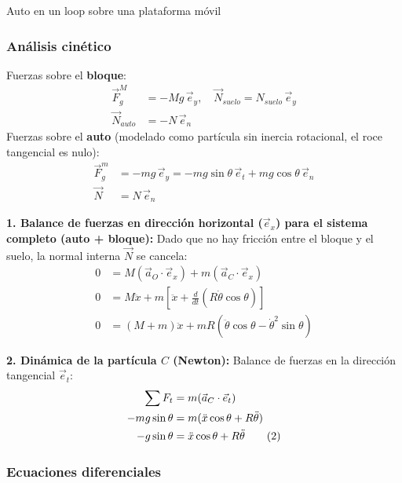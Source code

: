\begin{solucion}{Auto en un loop sobre una plataforma móvil}
\subsubsection*{Análisis cinético}

Fuerzas sobre el \textbf{bloque}:
\begin{align*}
\vec{F}_g^M &= -Mg\,\vec{e}_y, \quad \vec{N}_{suelo} = N_{suelo}\,\vec{e}_y \\
\vec{N}_{auto} &= -N\,\vec{e}_n
\end{align*}
Fuerzas sobre el \textbf{auto} (modelado como partícula sin inercia rotacional, el roce tangencial es nulo):
\begin{align*}
\vec{F}_g^m &= -mg\,\vec{e}_y = -mg\sin\theta\,\vec{e}_t + mg\cos\theta\,\vec{e}_n \\
\vec{N} &= N\,\vec{e}_n
\end{align*}

\textbf{1. Balance de fuerzas en dirección horizontal ($\vec{e}_x$) para el sistema completo (auto + bloque):}
Dado que no hay fricción entre el bloque y el suelo, la normal interna $\vec{N}$ se cancela:
\begin{align}
0 &= M(\vec{a}_O \cdot \vec{e}_x) + m(\vec{a}_C \cdot \vec{e}_x) \\
0 &= M\ddot{x} + m\left[\ddot{x} + \frac{d}{dt}(R\dot{\theta}\cos\theta)\right] \\
0 &= (M+m)\ddot{x} + mR(\ddot{\theta}\cos\theta - \dot{\theta}^2\sin\theta) \tag{1}
\end{align}

\textbf{2. Dinámica de la partícula $C$ (Newton):}
Balance de fuerzas en la dirección tangencial $\vec{e}_t$:
\begin{align}
\sum F_t &= m(\vec{a}_C \cdot \vec{e}_t) \notag \\
-mg\sin\theta &= m(\ddot{x}\cos\theta + R\ddot{\theta}) \notag \\
-g\sin\theta &= \ddot{x}\cos\theta + R\ddot{\theta} \tag{2}
\end{align}

\subsubsection*{Ecuaciones diferenciales}


\end{solucion}
